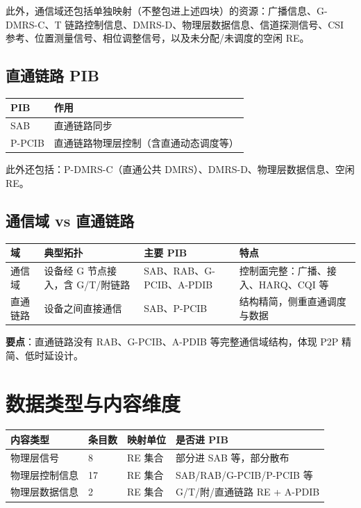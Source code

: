 \documentclass[11pt,a4paper]{ctexart}
\begin{document}
此外，通信域还包括单独映射（不整包进上述四块）的资源：广播信息、G-DMRS-C、T 链路控制信息、DMRS-D、物理层数据信息、信道探测信号、CSI 参考、位置测量信号、相位调整信号，以及未分配/未调度的空闲 RE。

\subsection{直通链路 PIB}

\begin{table}[h]
\centering
\small
\begin{tabular}{ll}
\toprule
\textbf{PIB} & \textbf{作用} \\
\midrule
SAB & 直通链路同步 \\
P-PCIB & 直通链路物理层控制（含直通动态调度等） \\
\bottomrule
\end{tabular}
\end{table}

此外还包括：P-DMRS-C（直通公共 DMRS）、DMRS-D、物理层数据信息、空闲 RE。

\subsection{通信域 vs 直通链路}

\begin{table}[h]
\centering
\small
\begin{tabular}{llll}
\toprule
\textbf{域} & \textbf{典型拓扑} & \textbf{主要 PIB} & \textbf{特点} \\
\midrule
通信域 & 设备经 G 节点接入，含 G/T/附链路 & SAB、RAB、G-PCIB、A-PDIB & 控制面完整：广播、接入、HARQ、CQI 等 \\
直通链路 & 设备之间直接通信 & SAB、P-PCIB & 结构精简，侧重直通调度与数据 \\
\bottomrule
\end{tabular}
\end{table}

\textbf{要点}：直通链路没有 RAB、G-PCIB、A-PDIB 等完整通信域结构，体现 P2P 精简、低时延设计。

\section{数据类型与内容维度}

\begin{table}[h]
\centering
\small
\begin{tabular}{llll}
\toprule
\textbf{内容类型} & \textbf{条目数} & \textbf{映射单位} & \textbf{是否进 PIB} \\
\midrule
物理层信号 & 8 & RE 集合 & 部分进 SAB 等，部分散布 \\
物理层控制信息 & 17 & RE 集合 & SAB/RAB/G-PCIB/P-PCIB 等 \\
物理层数据信息 & 2 & RE 集合 & G/T/附/直通链路 RE + A-PDIB \\
\bottomrule
\end{tabular}
\end{table}
\end{document}
